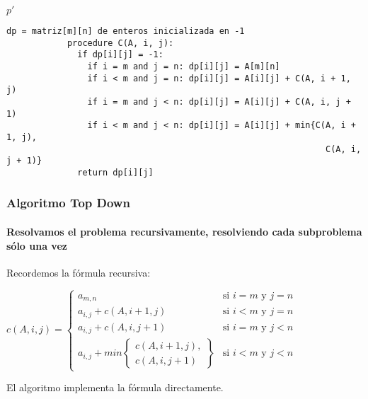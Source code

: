 \documentclass[spanish]{beamer}
\begin{document}
\begin{frame}
\begin{minipage}[t][8em][t]{\textwidth}
\begin{center}
{                    $p'$
                }
            \end{center}
        \end{minipage}
    \end{frame}

    \newsavebox{\algoritmoTopDown}
    \begin{lrbox}{\algoritmoTopDown}
        \begin{lstlisting}[gobble=12]
            dp = matriz[m][n] de enteros inicializada en -1
            procedure C(A, i, j):
              if dp[i][j] = -1:
                if i = m and j = n: dp[i][j] = A[m][n]
                if i < m and j = n: dp[i][j] = A[i][j] + C(A, i + 1, j)
                if i = m and j < n: dp[i][j] = A[i][j] + C(A, i, j + 1)
                if i < m and j < n: dp[i][j] = A[i][j] + min{C(A, i + 1, j),
                                                               C(A, i, j + 1)}
              return dp[i][j]
        \end{lstlisting}
    \end{lrbox}

    \begin{frame}
        \frametitle{Algoritmo Top Down}
        \framesubtitle{Resolvamos el problema recursivamente, resolviendo cada subproblema sólo una vez}

        \vspace{1em}
        Recordemos la fórmula recursiva:

        \vspace{1em}
        $
        c(A, i, j) =
        \left\{
            \begin{array}{ll}
                a_{m,n}                                           & \mbox{si } i = m \mbox{ y } j = n \\
                a_{i,j} + c(A, i + 1, j)                          & \mbox{si } i < m \mbox{ y } j = n \\
                a_{i,j} + c(A, i, j + 1)                          & \mbox{si } i = m \mbox{ y } j < n \\
                a_{i,j} + min \left\{
                    \begin{array}{l}
                        c(A, i + 1, j), \\
                        c(A, i, j + 1)
                    \end{array}
                    \right\}                                      & \mbox{si } i < m \mbox{ y } j < n
            \end{array}
        \right.
        $

        \pause

        \vspace{1em}
        El algoritmo implementa la fórmula directamente.

        \vspace{1em}
        \usebox{\algoritmoTopDown}
    \end{frame}
\end{document}
